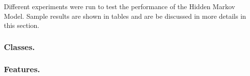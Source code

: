 
\begin{comment}
Experiments / Empirical evaluation (roughly 2-3 pages)
• Any details about experiments (dataset sizes, parameter selection, etc)
• Results
• Analysis (discussion of results / visualization / findings / etc)
\end{comment}


Different experiments were run to test the performance of the Hidden Markov Model. Sample results are shown in tables and are be discussed in more details in this section.


\begin{comment}
\red{correct the table for the HMM}
\begin{table}[h!]
\begin{center}
\begin{tabular}{| c | c | c | c | c | c | c |}
\hline
 {\textbf{Classes}} 			& {\textbf{Features}} 
 & {\textbf{Data per class}} 					& {\textbf{Clusters}} 
 & {\textbf{Train Axccuracy}} 					& {\textbf{Test Accuracy}} 
 \\
\hline
2 			& all 				& 500 		& 50			& ?			& ? 			\\
2 			& subset 		& 500 		& 50			& ?			& ? 			\\
3 			& all 				& 500 		& 50			& ?			& ? 			\\
3 			& subset 		& 500 		& 50			& ?			& ? 			\\
14 		& all		 		& 500 		& 50			& ?			& ? 			\\
14 		& subset 		& 500 		& 50			& ?			& ? 			\\
\hline
\end{tabular}
\caption{AMP accuracy}
\label{table:HMMaccuracy}
\end{center}
\end{table}
\end{comment}

\subsubsection*{Classes.} 


\subsubsection*{Features.}


